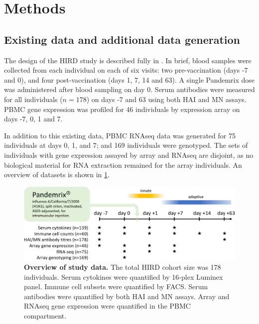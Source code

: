 \section{Methods}

\subsection{Existing  data and additional data generation}
\label{subsec:hird_dge_studyDesign}

The design of the \gls{HIRD} study is described fully in \textcite{sobolev2016AdjuvantedInfluenzaH1N1Vaccination}.
In brief, blood samples were collected from each individual on each of six visits:
two pre-vaccination (days -7 and 0), and four post-vaccination (days 1, 7, 14 and 63).
A single Pandemrix dose was administered after blood sampling on day 0.
Serum antibodies were measured for all individuals ($n=178$) on days -7 and 63 using both \gls{HAI} and \gls{MN} assays. 
\gls{PBMC} gene expression was profiled for 46 individuals by expression array on days -7, 0, 1 and 7.

In addition to this existing data, 
\gls{PBMC} \gls{RNAseq} data was generated for 75 individuals at days 0, 1, and 7;
and 169 individuals were genotyped.
The sets of individuals with gene expression assayed by array and \gls{RNAseq} are disjoint, 
as no biological material for RNA extraction remained for the array individuals.
An overview of datasets is shown in \cref{fig:hird_design}.

\begin{figure}
    \includegraphics[width=1.0\textwidth]{mainmatter/figures/chapter_02/graphics_ashg19/hird_design-crop.pdf}
    \caption{
        \textbf{Overview of study data.}
        The total \gls{HIRD} cohort size was 178 individuals.
        Serum cytokines were quantified by 16-plex Luminex panel.
        Immune cell subsets were quantified by \gls{FACS}.
        Serum antibodies were quantified by both \gls{HAI} and \gls{MN} assays.
        Array and \gls{RNAseq} gene expression were quantified in the \gls{PBMC} compartment.
    }
    \label{fig:hird_design}
\end{figure}

